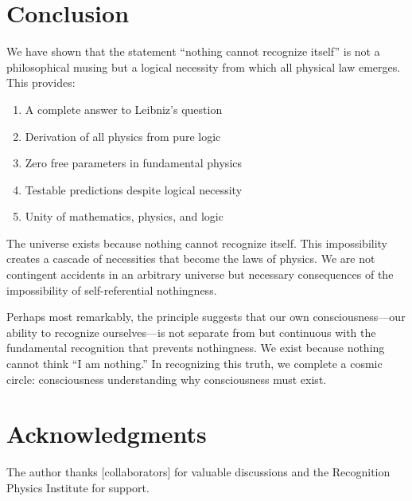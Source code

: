 \documentclass[12pt,a4paper]{article}
\begin{document}
\section{Conclusion}

We have shown that the statement ``nothing cannot recognize itself'' is not a philosophical musing but a logical necessity from which all physical law emerges. This provides:

\begin{enumerate}
\item A complete answer to Leibniz's question
\item Derivation of all physics from pure logic
\item Zero free parameters in fundamental physics
\item Testable predictions despite logical necessity
\item Unity of mathematics, physics, and logic
\end{enumerate}

The universe exists because nothing cannot recognize itself. This impossibility creates a cascade of necessities that become the laws of physics. We are not contingent accidents in an arbitrary universe but necessary consequences of the impossibility of self-referential nothingness.

Perhaps most remarkably, the principle suggests that our own consciousness---our ability to recognize ourselves---is not separate from but continuous with the fundamental recognition that prevents nothingness. We exist because nothing cannot think ``I am nothing.'' In recognizing this truth, we complete a cosmic circle: consciousness understanding why consciousness must exist.

\section*{Acknowledgments}

The author thanks [collaborators] for valuable discussions and the Recognition Physics Institute for support.
\end{document}
